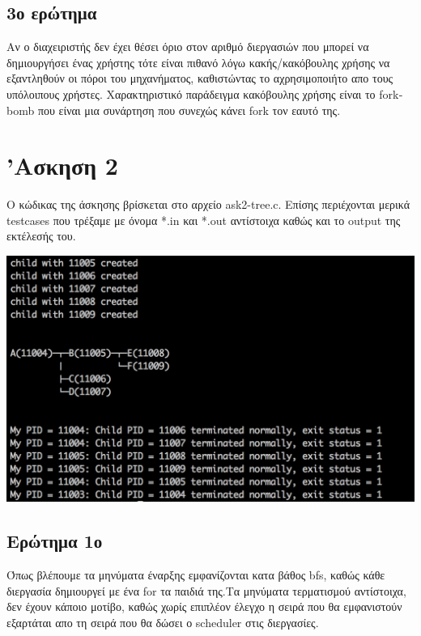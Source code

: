 \documentclass[12pt]{article}
\begin{document}
\subsection*{3ο ερώτημα}

Αν ο διαχειριστής δεν έχει θέσει όριο στον αριθμό διεργασιών που μπορεί να δημιουργήσει ένας χρήστης τότε είναι πιθανό λόγω κακής/κακόβουλης χρήσης να εξαντληθούν οι πόροι του μηχανήματος, καθιστώντας το αχρησιμοποιήτο απο τους υπόλοιπους χρήστες. Χαρακτηριστικό παράδειγμα κακόβουλης χρήσης είναι το \textlatin{forkbomb} που είναι μια συνάρτηση που συνεχώς κάνει \textlatin{fork} τον εαυτό της.


\section*{'Ασκηση 2}

Ο κώδικας της άσκησης βρίσκεται στο αρχείο \textlatin{ask2-tree.c}. Επίσης περιέχονται μερικά \textlatin{testcases} που τρέξαμε με όνομα \textlatin{*.in} και \textlatin{*.out} αντίστοιχα καθώς και το \textlatin{output} της εκτέλεσής του. 

\includegraphics[scale=0.5]{ask2-tree.png}

\subsection*{Ερώτημα 1ο}

Όπως βλέπουμε τα μηνύματα έναρξης εμφανίζονται κατα βάθος \textlatin{bfs}, καθώς κάθε διεργασία δημιουργεί με ένα \textlatin{for} τα παιδιά της.Τα μηνύματα τερματισμού αντίστοιχα, δεν έχουν κάποιο μοτίβο, καθώς χωρίς επιπλέον έλεγχο η σειρά που θα εμφανιστούν εξαρτάται απο τη σειρά που θα δώσει ο \textlatin{scheduler} στις διεργασίες.
\end{document}
